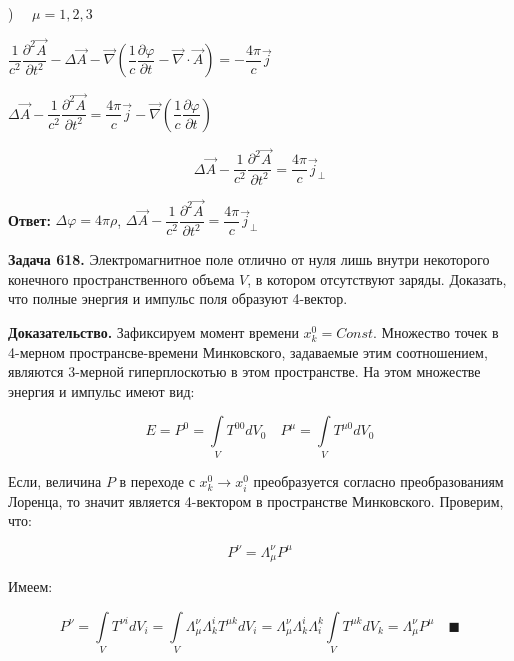 \documentclass[a4paper,12pt]{article}
\begin{document}
	) $\quad \mu = 1,2,3$
	
	\begin{center}
		$\dfrac{1}{c^2}\dfrac{\partial^2 \vec{A}}{\partial t^2} - \Delta \vec{A} - \vec{\nabla}\left(\dfrac{1}{c}\dfrac{\partial \varphi}{\partial t}-\vec{\nabla} \cdot \vec{A}\right) = -\dfrac{4\pi}{c} \vec{j}$
	
		$\Delta\vec{A} - \dfrac{1}{c^2} \dfrac{\partial^2 \vec{A}}{\partial t^2} = \dfrac{4\pi }{c}\vec{j} - \vec{\nabla}\left(\dfrac{1}{c} \dfrac{\partial \varphi}{\partial t}\right) $
	\end{center}
	
	\begin{equation}
		\Delta \vec{A} - \dfrac{1}{c^2} \dfrac{\partial^2 \vec{A}}{\partial t^2} = \dfrac{4\pi}{c} \vec{j}_\perp
	\end{equation}
	
	\quad \textbf{Ответ:} $ \Delta \varphi = 4\pi\rho$, \quad$\Delta \vec{A} - \dfrac{1}{c^2} \dfrac{\partial^2 \vec{A}}{\partial t^2} = \dfrac{4\pi}{c} \vec{j}_\perp$
	
	\quad \textbf{Задача 618.} Электромагнитное поле отлично от нуля лишь внутри некоторого конечного пространственного объема $V$, в котором отсутствуют заряды. Доказать, что полные энергия и импульс поля образуют 4-вектор.
	
	\quad \textbf{Доказательство.} Зафиксируем момент времени $x^0_{k} = Const$. Множество точек в 4-мерном пространсве-времени Минковского, задаваемые этим соотношением, являются 3-мерной гиперплоскотью в этом пространстве. На этом множестве энергия и импульс имеют вид: 
	
	\begin{equation}
		E = P^0 = \displaystyle\int\limits_{V} T^{00} dV_0 \quad P^{\mu} = \displaystyle\int\limits_{V} T^{\mu 0} dV_0 
	\end{equation}
	
	\quad Если, величина $P$ в переходе с $x^0_{k} \to x^0_i$ преобразуется согласно преобразованиям Лоренца, то значит является 4-вектором в пространстве Минковского. Проверим, что:
	
	\begin{equation}
		P^{\nu} = \Lambda^{\nu}_{\mu} P^{\mu} 
	\end{equation}

	\quad Имеем:
	
	\begin{equation}
		P^{\nu} =  \displaystyle\int\limits_{V} T^{\nu i} dV_i = \displaystyle\int\limits_{V} \Lambda_{\mu}^{\nu} \Lambda_{k}^{i} T^{\mu k} dV_i = \Lambda_{\mu}^{\nu} \Lambda_{k}^{i} \Lambda_{i}^{k} \displaystyle\int\limits_{V} T^{\mu k}dV_k = \Lambda_{\mu}^{\nu} P^{\mu}\quad \blacksquare 
	\end{equation}
	
\end{document}
